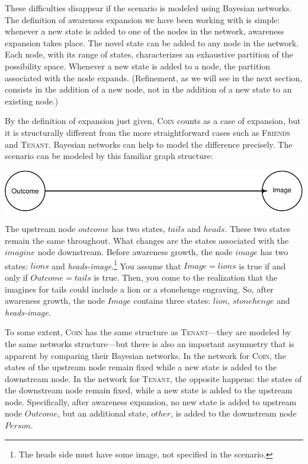 \documentclass[
  11pt,
  dvipsnames,enabledeprecatedfontcommands]{scrartcl}
\begin{document}
These difficulties disappear if the scenario is modeled using Bayesian
networks. The definition of awareness expansion we have been working
with is simple: whenever a new state is added to one of the nodes in the
network, awareness expansion takes place. The novel state can be added
to any node in the network. Each node, with its range of states,
characterizes an exhaustive partition of the possibility space. Whenever
a new state is added to a node, the partition associated with the node
expands. (Refinement, as we will see in the next section, consists in
the addition of a new node, not in the addition of a new state to an
existing node.)

By the definition of expansion just given, \textsc{Coin} counts as a
case of expansion, but it is structurally different from the more
straightforward cases such as \textsc{Friends} and \textsc{Tenant}.
Bayesian networks can help to model the difference precisely. The
scenario can be modeled by this familiar graph structure:

\begin{center}\includegraphics[width=0.5\linewidth,height=0.3\textheight]{ReplyToSteeleStefansson5_files/figure-latex/tailsDAG-1} \end{center}

\noindent The upstream node \(outcome\) has two states, \(tails\) and
\(heads\). These two states remain the same throughout. What changes are
the states associated with the \(imagine\) node downstream. Before
awareness growth, the node \(image\) has two states: \(lions\) and
\textit{heads-image}.\footnote{The heads side must have some image, not
  specified in the scenario.} You assume that \(Image=lions\) is true if
and only if \(Outcome=tails\) is true. Then, you come to the realization
that the imagines for tails could include a lion or a stonehenge
engraving. So, after awareness growth, the node \(Image\) contains three
states: \(lion\), \(stonehenge\) and \textit{heads-image}.

To some extent, \textsc{Coin} has the same structure as
\textsc{Tenant}---they are modeled by the same networks structure---but
there is also an important asymmetry that is apparent by comparing their
Bayesian networks. In the network for \textsc{Coin}, the states of the
upstream node remain fixed while a new state is added to the downstream
node. In the network for \textsc{Tenant}, the opposite happens: the
states of the downstream node remain fixed, while a new state is added
to the upstream node. Specifically, after awareness expansion, no new
state is added to upstream node \(Outcome\), but an additional state,
\(other\), is added to the downstream node \(Person\).
\end{document}
